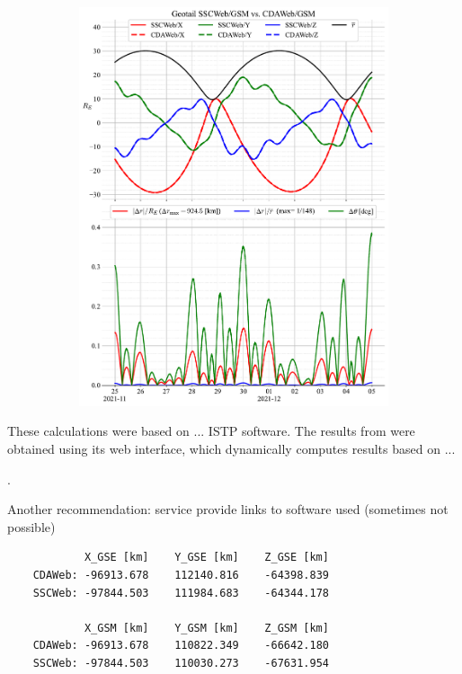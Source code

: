 \documentclass[draft]{agujournal2019}
\begin{document}
\begin{figure}[h]
\begin{subfigure}[b]{0.49\textwidth}
         \includegraphics[width=\textwidth]{figures/Geotail_SSCWeb-GSM_vs_CDAWeb-GSM.pdf}
     \end{subfigure}
     \caption{}
     \label{fig:geotail}
\end{figure}

\clearpage


These calculations were based on ... ISTP software. The results from  were obtained using its web interface, which dynamically computes results based on ...

.

Another recommendation: service provide links to software used (sometimes not possible)

\begin{verbatim}
            X_GSE [km]    Y_GSE [km]    Z_GSE [km]
    CDAWeb: -96913.678    112140.816    -64398.839
    SSCWeb: -97844.503    111984.683    -64344.178

            X_GSM [km]    Y_GSM [km]    Z_GSM [km]
    CDAWeb: -96913.678    110822.349    -66642.180
    SSCWeb: -97844.503    110030.273    -67631.954
\end{verbatim}
\end{document}

